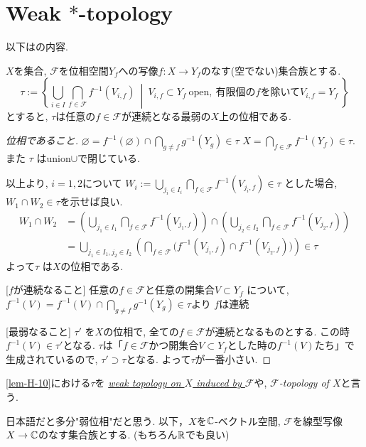 \section{Weak $*$-topology}
以下は\cite[3.8-3.14]{Rud}の内容. 

\begin{tcolorbox}[mybox]
\begin{lem}%
\label{lem-H-10}
\(X\)を集合,  \(\mathscr{F}\)を位相空間$Y_f$への写像\(f : X \to Y_f\)のなす(空でない)集合族とする. 
\[
\tau := \left\{ \bigcup_{i \in I} \bigcap_{f \in \mathscr{F}} f^{-1}(V_{i, f}) \ \middle|\ V_{i, f} \subset Y_f \ \text{open}, \ \text{有限個の$f$を除いて} V_{i, f}= Y_f \  \right\}
\]
とすると, \(\tau\)は任意の$f \in \mathscr{F}$が連続となる最弱の$X$上の位相である.
\end{lem}
\end{tcolorbox}
\begin{proof}
[位相であること]
\(\varnothing = f^{-1}(\varnothing) \cap \bigcap_{g \neq f} g^{-1}(Y_g)  \in \tau\)
 \(X= \bigcap_{f \in \mathscr{F}}f^{-1}(Y_f) \in \tau\).  
また \(\tau\) はunion$\cup$で閉じている.  

以上より, $i=1,2$について
\(W_i := \bigcup_{j_i \in I_i} \bigcap_{f \in \mathscr{F}} f^{-1}(V_{j_i, f})\in \tau \)
とした場合, $W_1 \cap W_2 \in \tau$を示せば良い. 
\begin{align*}
W_1 \cap W_2 
&= \left(\bigcup_{j_1 \in I_1} \bigcap_{f \in \mathscr{F}} f^{-1}(V_{j_1, f}) \right)
\cap 
\left( \bigcup_{j_2 \in I_2} \bigcap_{f \in \mathscr{F}} f^{-1}(V_{j_2, f}) \right)\\
&= 
\bigcup_{j_1 \in I_1, j_2 \in I_2} 
\left( \bigcap_{f \in \mathscr{F}} \big( f^{-1}(V_{j_1, f}) \cap f^{-1}(V_{j_2, f}) \big) 
\right)
\in \tau
\end{align*}
よって\(\tau\) は$X$の位相である. 

[$f$が連続なること]
任意の\(f \in \mathscr{F}\)と任意の開集合\(V \subset Y_f\) について, 
\(f^{-1}(V) = f^{-1}(V)\cap \bigcap_{g \neq f}  g^{-1}(Y_g) \in \tau\)より
\(f\)は連続

[最弱なること]
\(\tau'\) を\(X\)の位相で, 全ての\(f \in \mathscr{F}\)が連続となるものとする. 
この時\(f^{-1}(V) \in \tau'\)となる. 
\(\tau\)は「\(f \in \mathscr{F}\)かつ開集合\(V \subset Y_f\)とした時の\(f^{-1}(V)\)たち」で生成されているので, 
\( \tau' \supset \tau\)となる.
よって$\tau$が一番小さい. 
\end{proof}

\begin{tcolorbox}[mybox]
\begin{defn}%
\label{defn-H-11}
\ref{lem-H-10}における\(\tau\)を
\underline{\emph{weak topology on \(X\) induced by \(\mathscr{F}\)}}や, \emph{\(\mathscr{F}\)-topology of \(X\)}と言う. 
\end{defn}
\end{tcolorbox}
日本語だと多分"弱位相"だと思う. 
以下，\(X\)を$\mathbb{C}$-ベクトル空間,  \(\mathscr{F}\)を線型写像$X \to \mathbb{C}$のなす集合族とする. 
(もちろん$\mathbb{R}$でも良い)

